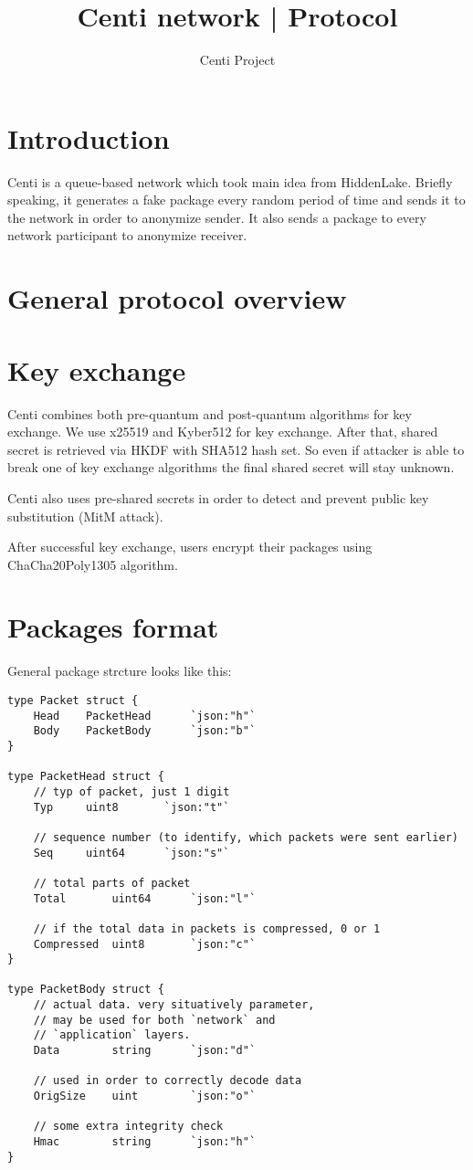 \documentclass{article}
\title{Centi network | Protocol}
\author{Centi Project}
\begin{document}
\maketitle
\newpage
\tableofcontents
\newpage

\section{Introduction}
	Centi is a queue-based network which took main idea from HiddenLake. Briefly speaking,
	it generates a fake package every random period of time and sends it to the network
	in order to anonymize sender. It also sends a package to every network participant
	to anonymize receiver.

\section{General protocol overview}
\section{Key exchange}
	Centi combines both pre-quantum and post-quantum algorithms for key exchange. We use
	x25519 and Kyber512 for key exchange. After that, shared secret is retrieved via HKDF
	with SHA512 hash set. So even if attacker is able to break one of key exchange algorithms
	the final shared secret will stay unknown.

	Centi also uses pre-shared secrets in order to detect and prevent public key substitution
	(MitM attack).

	After successful key exchange, users encrypt their packages using ChaCha20Poly1305 algorithm.
\section{Packages format}
	General package strcture looks like this:
	\begin{lstlisting}
type Packet struct {
	Head	PacketHead		`json:"h"`
	Body	PacketBody		`json:"b"`
}

type PacketHead struct {
	// typ of packet, just 1 digit
	Typ		uint8		`json:"t"`

	// sequence number (to identify, which packets were sent earlier)
	Seq		uint64		`json:"s"`	
	
	// total parts of packet
	Total		uint64		`json:"l"`

	// if the total data in packets is compressed, 0 or 1
	Compressed	uint8		`json:"c"`
}

type PacketBody struct {
	// actual data. very situatively parameter,
	// may be used for both `network` and
	// `application` layers.
	Data		string		`json:"d"`

	// used in order to correctly decode data
	OrigSize	uint		`json:"o"`

	// some extra integrity check
	Hmac		string		`json:"h"`
}
	\end{lstlisting}
\end{document}
